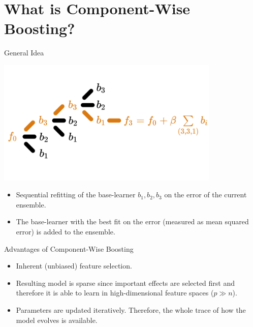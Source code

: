 \documentclass[10pt]{beamer}\usepackage[]{graphicx}\usepackage[]{color}
\begin{document}
\section{What is Component-Wise Boosting?}

\begin{frame}{General Idea}

\begin{center}
\includegraphics[width=0.8\textwidth]{./images/cboost_gif_norisk.png}
\end{center}

\vspace{-1cm}

\begin{itemize}

  \item
    Sequential refitting of the base-learner $b_1, b_2, b_3$ on the error of the current ensemble.

  \item
    The base-learner with the best fit on the error (measured as mean squared error) is added to the ensemble.

\end{itemize}

\end{frame}

\begin{frame}{Advantages of Component-Wise Boosting}

  \begin{itemize}

    \item
      Inherent (unbiased) feature selection.

    \item
      Resulting model is sparse since important effects are selected first and therefore it is able to learn in high-dimensional feature spaces ($p \gg n$).

    \item
      Parameters are updated iteratively. Therefore, the whole trace of how the model evolves is available.

  \end{itemize}

\end{frame}
\end{document}
